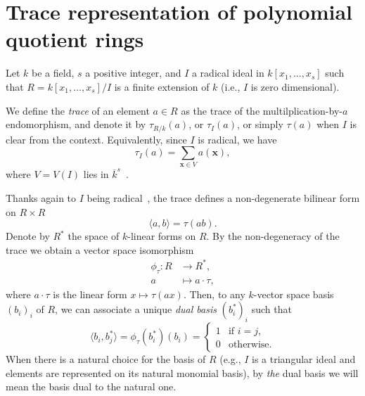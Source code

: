 \documentclass[12pt]{article}
\def\x {\ensuremath{\mathbf{x}}}
\newcommand{\bk}[2]{\langle#1,#2\rangle}
\begin{document}

\section{Trace representation of polynomial quotient rings}

Let $k$ be a field, $s$ a positive integer, and $I$ a radical ideal in
$k[x_1,\dots,x_s]$ such that $R=k[x_1,\dots,x_s]/I$ is a finite
extension of $k$ (i.e., $I$ is zero dimensional).

We define the \emph{trace} of an element $a\in R$ as the trace of the
multilplication-by-$a$ endomorphism, and denote it by $\tau_{R/k}(a)$,
or $\tau_I(a)$, or simply $\tau(a)$ when $I$ is clear from the
context.  Equivalently, since $I$ is radical, we have
\begin{equation}\label{eq:tr}
\tau_{I}(a)=\sum_{\x \in V} a(\x),
\end{equation}
where $V=V(I)$ lies in $\overline{k}^s$~\cite{todo}.

Thanks again to $I$ being radical~\cite{todo}, the trace defines a
non-degenerate bilinear form on $R\times R$
\begin{equation}
  \label{eq:trace-def}
  \bk{a}{b} = \tau(ab).
\end{equation}
Denote by $R^\ast$ the space of $k$-linear forms on $R$. By the
non-degeneracy of the trace we obtain a vector space isomorphism
\begin{equation}
  \label{eq:trace-isom}
  \begin{aligned}
  \phi_\tau : R &\to R^\ast,\\
            a &\mapsto a\cdot\tau,
  \end{aligned}
\end{equation}
where $a\cdot\tau$ is the linear form $x\mapsto\tau(ax)$. Then, to any
$k$-vector space basis $(b_i)_i$ of $R$, we can associate a unique
\emph{dual basis} $(b_i^\ast)_i$ such that
\begin{equation}
  \label{eq:dual-basis}
  \bk{b_i}{b_j^\ast} = \phi_\tau(b_i^\ast)(b_i) = \begin{cases}
    1 &\text{if $i=j$,}\\
    0 &\text{otherwise}.
  \end{cases}
\end{equation}
When there is a natural choice for the basis of $R$ (e.g., $I$ is a
triangular ideal and elements are represented on its natural monomial
basis), by \emph{the} dual basis we will mean the basis dual to the
natural one.
\end{document}
